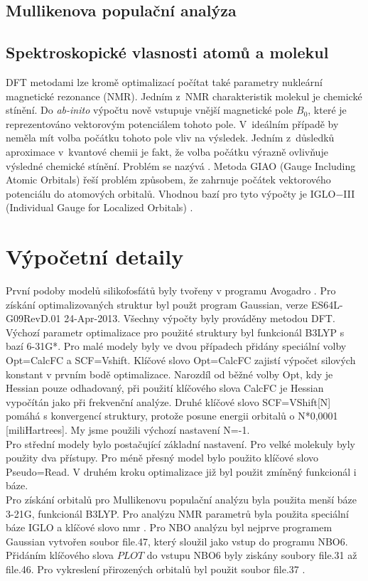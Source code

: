 \documentclass[
  digital, %
  table,   %
  lof,     %
  lot,     %
  oneside,
]{fithesis3}
\begin{document}
\subsection{Mullikenova populační analýza}

\subsection{Spektroskopické vlasnosti atomů a molekul}
DFT metodami lze kromě optimalizací počítat také parametry nukleární magnetické rezonance (NMR). Jedním z~NMR charakteristik molekul je chemické stínění. Do \textit{ab-inito} výpočtu nově vstupuje vnější magnetické pole $B_0$, které je reprezentováno vektorovým potenciálem tohoto pole. V~ideálním případě by neměla mít volba počátku tohoto pole vliv na výsledek. Jedním z~důsledků aproximace v~kvantové chemii je fakt, že volba počátku výrazně ovlivňuje výsledné chemické stínění. Problém se nazývá . Metoda GIAO (Gauge  Including Atomic Orbitals) řeší problém způsobem, že zahrnuje počátek vektorového potenciálu do atomových orbitalů. Vhodnou bazí pro tyto výpočty je IGLO$-$III (Individual Gauge for Localized Orbitals) \cite{Standara2006thesis} \cite{g09}.


\section{Výpočetní detaily}
První podoby modelů silikofosfátů byly tvořeny v programu Avogadro \cite{Avogadro}. Pro získání optimalizovaných struktur byl použt program Gaussian, verze ES64L-G09RevD.01 24-Apr-2013. Všechny výpočty byly prováděny metodou DFT. Výchozí parametr optimalizace pro použité struktury byl funkcionál B3LYP s bazí 6-31G*. Pro malé modely byly ve dvou případech přidány speciální volby Opt=CalcFC a SCF=Vshift. Klíčové slovo Opt=CalcFC zajistí výpočet silových konstant v prvním bodě optimalizace. Narozdíl od běžné volby Opt, kdy je Hessian pouze odhadovaný, při použití klíčového slova CalcFC je Hessian vypočítán jako při frekvenční analýze. Druhé klíčové slovo SCF=VShift[N] pomáhá s konvergencí struktury, protože posune energii orbitalů o N*0,0001 [miliHartrees]. My jsme použili výchozí nastavení N=-1. \\
Pro střední modely bylo postačující základní nastavení. Pro velké molekuly byly použity dva přístupy. Pro méně přesný model bylo použito klíčové slovo Pseudo=Read. V druhém kroku optimalizace již byl použit zmíněný funkcionál i báze. \\
Pro získání orbitalů pro Mullikenovu populační analýzu byla použita menší báze 3-21G, funkcionál B3LYP. Pro analýzu NMR parametrů byla použita speciální báze IGLO \cite{iglo} a klíčové slovo nmr \cite{g09}.
 Pro NBO analýzu byl nejprve programem Gaussian vytvořen soubor file.47, který sloužil jako vstup do programu NBO6. Přidáním klíčového slova $PLOT$ do vstupu NBO6 byly ziskány soubory file.31 až file.46. Pro vykreslení přirozených orbitalů byl použit soubor file.37 \cite{doi:10.1002/jcc.23266}.
\end{document}
